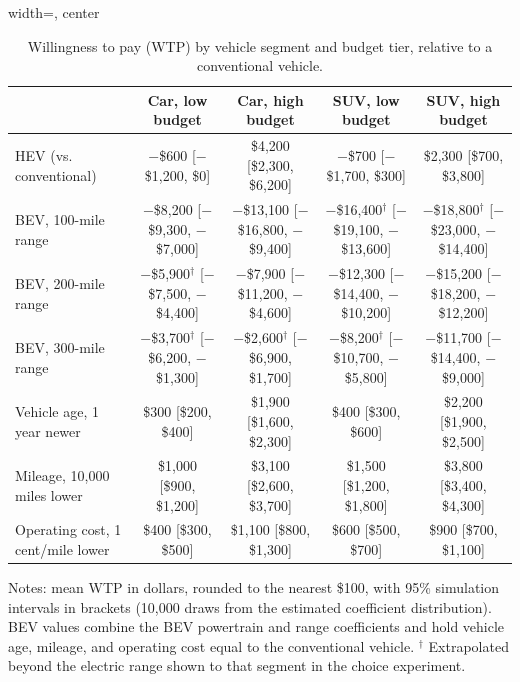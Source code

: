 \begin{table}[pos=H]
\footnotesize
\caption{Willingness to pay (WTP) by vehicle segment and budget tier, relative to a conventional vehicle.}
\label{table:wtp_vehicle_attributes}
\begin{adjustbox}{width=\textwidth, center}
\begin{tabular}{l cccc}
\toprule
 & \textbf{Car, low budget} & \textbf{Car, high budget} & \textbf{SUV, low budget} & \textbf{SUV, high budget} \\
\midrule
HEV (vs. conventional) & $-$\$600 [$-$\$1,200, \$0] & \$4,200 [\$2,300, \$6,200] & $-$\$700 [$-$\$1,700, \$300] & \$2,300 [\$700, \$3,800] \\
BEV, 100-mile range & $-$\$8,200 [$-$\$9,300, $-$\$7,000] & $-$\$13,100 [$-$\$16,800, $-$\$9,400] & $-$\$16,400$^{\dagger}$ [$-$\$19,100, $-$\$13,600] & $-$\$18,800$^{\dagger}$ [$-$\$23,000, $-$\$14,400] \\
BEV, 200-mile range & $-$\$5,900$^{\dagger}$ [$-$\$7,500, $-$\$4,400] & $-$\$7,900 [$-$\$11,200, $-$\$4,600] & $-$\$12,300 [$-$\$14,400, $-$\$10,200] & $-$\$15,200 [$-$\$18,200, $-$\$12,200] \\
BEV, 300-mile range & $-$\$3,700$^{\dagger}$ [$-$\$6,200, $-$\$1,300] & $-$\$2,600$^{\dagger}$ [$-$\$6,900, \$1,700] & $-$\$8,200$^{\dagger}$ [$-$\$10,700, $-$\$5,800] & $-$\$11,700 [$-$\$14,400, $-$\$9,000] \\
\addlinespace[4pt]
Vehicle age, 1 year newer & \$300 [\$200, \$400] & \$1,900 [\$1,600, \$2,300] & \$400 [\$300, \$600] & \$2,200 [\$1,900, \$2,500] \\
Mileage, 10,000 miles lower & \$1,000 [\$900, \$1,200] & \$3,100 [\$2,600, \$3,700] & \$1,500 [\$1,200, \$1,800] & \$3,800 [\$3,400, \$4,300] \\
Operating cost, 1 cent/mile lower & \$400 [\$300, \$500] & \$1,100 [\$800, \$1,300] & \$600 [\$500, \$700] & \$900 [\$700, \$1,100] \\
\bottomrule
\end{tabular}
\end{adjustbox}
\par\smallskip
\begin{minipage}{\textwidth}
\footnotesize Notes: mean WTP in dollars, rounded to the nearest \$100, with 95\% simulation intervals in brackets (10,000 draws from the estimated coefficient distribution). BEV values combine the BEV powertrain and range coefficients and hold vehicle age, mileage, and operating cost equal to the conventional vehicle. $^{\dagger}$ Extrapolated beyond the electric range shown to that segment in the choice experiment.
\end{minipage}
\end{table}
